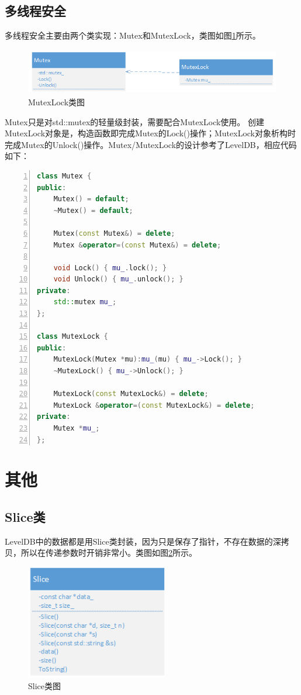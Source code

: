 \documentclass[bachelor]{thesis-uestc}
\begin{document}
\subsection{多线程安全}
多线程安全主要由两个类实现：Mutex和MutexLock，类图如图\ref{fig:mutexlock}所示。

\begin{figure}[htbp]
	\centering\includegraphics[height=2cm]{images/mutexlock.png}
	\caption{MutexLock类图}
	\label{fig:mutexlock}
\end{figure}

Mutex只是对std::mutex的轻量级封装，需要配合MutexLock使用。 创建MutexLock对象是，构造函数即完成Mutex的Lock()操作；MutexLock对象析构时完成Mutex的Unlock()操作。Mutex/MutexLock的设计参考了LevelDB，相应代码如下：

\begin{lstlisting}[language=C++, basicstyle=\ttfamily\tiny, numbers=left, numberstyle=\tiny, keywordstyle=\color{blue!70}, commentstyle=\color{red!50!green!50!blue!50}, frame=shadowbox, rulesepcolor=\color{red!20!green!20!blue!20}]
class Mutex {
public:
	Mutex() = default;
	~Mutex() = default;
	
	Mutex(const Mutex&) = delete;
	Mutex &operator=(const Mutex&) = delete;
	
	void Lock() { mu_.lock(); }
	void Unlock() { mu_.unlock(); }
private:
	std::mutex mu_;
};

class MutexLock {
public:
	MutexLock(Mutex *mu):mu_(mu) { mu_->Lock(); }
	~MutexLock() { mu_->Unlock(); }
	
	MutexLock(const MutexLock&) = delete;
	MutexLock &operator=(const MutexLock&) = delete;
private:
	Mutex *mu_;
};
\end{lstlisting}

\section{其他}
\subsection{Slice类}
LevelDB中的数据都是用Slice类封装，因为只是保存了指针，不存在数据的深拷贝，所以在传递参数时开销非常小。类图如图\ref{fig:slice}所示。

\begin{figure}[htbp]
	\centering\includegraphics[height=5cm]{images/slice.png}
	\caption{Slice类图}
	\label{fig:slice}
\end{figure}
\end{document}
